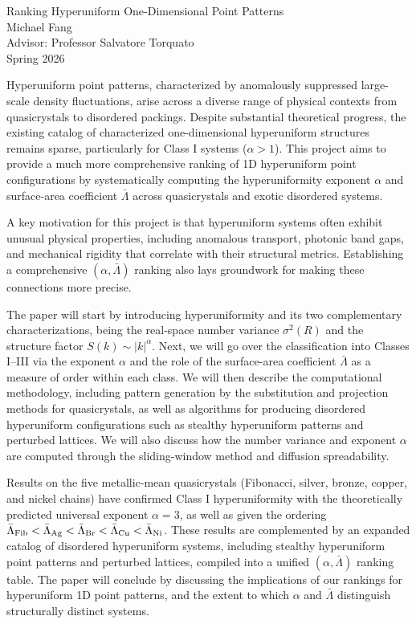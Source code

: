 \documentclass[12pt]{article}
\begin{document}
\begin{center}
  {\LARGE Ranking Hyperuniform One-Dimensional Point Patterns}\\[2em]
  Michael Fang\\
  Advisor: Professor Salvatore Torquato\\[1em]
  Spring 2026
\end{center}

\vspace{2em}

Hyperuniform point patterns, characterized by anomalously suppressed large-scale density
fluctuations, arise across a diverse range of physical contexts from quasicrystals to disordered
packings. Despite substantial theoretical progress, the existing catalog of characterized
one-dimensional hyperuniform structures remains sparse, particularly for Class I systems
($\alpha > 1$). This project aims to provide a much more comprehensive ranking of 1D
hyperuniform point configurations by systematically computing the hyperuniformity exponent
$\alpha$ and surface-area coefficient $\bar\Lambda$ across quasicrystals and exotic disordered
systems.

A key motivation for this project is that hyperuniform systems often exhibit unusual physical
properties, including anomalous transport, photonic band gaps, and mechanical rigidity that
correlate with their structural metrics. Establishing a comprehensive $(\alpha, \bar\Lambda)$
ranking also lays groundwork for making these connections more precise.

The paper will start by introducing hyperuniformity and its two complementary
characterizations, being the real-space number variance $\sigma^2(R)$ and the structure factor
$S(k) \sim |k|^\alpha$. Next, we will go over the classification into Classes I--III via the
exponent $\alpha$ and the role of the surface-area coefficient $\bar\Lambda$ as a measure of
order within each class. We will then describe the computational methodology, including pattern
generation by the substitution and projection methods for quasicrystals, as well as algorithms
for producing disordered hyperuniform configurations such as stealthy hyperuniform patterns and
perturbed lattices. We will also discuss how the number variance and exponent $\alpha$ are
computed through the sliding-window method and diffusion spreadability.

Results on the five metallic-mean quasicrystals (Fibonacci, silver, bronze, copper, and nickel
chains) have confirmed Class I hyperuniformity with the theoretically predicted universal
exponent $\alpha = 3$, as well as given the ordering
$\bar\Lambda_{\rm Fib} < \bar\Lambda_{\rm Ag} < \bar\Lambda_{\rm Br} < \bar\Lambda_{\rm Cu} < \bar\Lambda_{\rm Ni}$.
These results are complemented by an expanded catalog of disordered hyperuniform systems,
including stealthy hyperuniform point patterns and perturbed lattices, compiled into a unified
$(\alpha, \bar\Lambda)$ ranking table. The paper will conclude by discussing the implications
of our rankings for hyperuniform 1D point patterns, and the extent to which $\alpha$ and
$\bar\Lambda$ distinguish structurally distinct systems.
\end{document}

